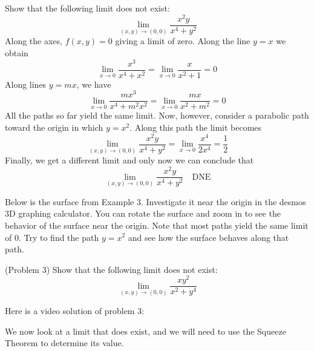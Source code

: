 \documentclass[handout]{ximera}
\begin{document}
\begin{example}[Example 3]
Show that the following limit does not exist:
\[
\lim_{(x,y) \to (0,0)} \frac{x^2y}{x^4 + y^2}
\]
Along the axes, $f(x,y) = 0$ giving a limit of zero. Along the line $y = x$ we obtain 
\[
\lim_{x\to 0} \frac{x^3}{x^4 + x^2} = \lim_{x\to 0} \frac{x}{x^2 + 1} = 0
\]
Along lines $ y = mx$, we have
\[
\lim_{x\to 0} \frac{mx^3}{x^4 + m^2x^2} = \lim_{x\to 0} \frac{mx}{x^2 + m^2} = 0
\]
All the paths so far yield the same limit.  Now, however, consider a parabolic path 
toward the origin in which $y = x^2$.
Along this path the limit becomes
\[
\lim_{(x,y) \to (0,0)} \frac{x^2y}{x^4 + y^2} =  \lim_{x \to 0} \frac{x^4}{2x^4} = \frac12
\]
Finally, we get a different limit and only now we can conclude that
\[
\lim_{(x,y) \to (0,0)} \frac{x^2y}{x^4 + y^2} \quad \text{DNE}
\]

\end{example}
Below is the surface from Example 3.  Investigate it near the origin in the 
desmos 3D graphing calculator.  
You can rotate the surface and zoom in to see the behavior of the surface near the origin.
Note that most paths yield the same limit of $0$.  
Try to find the path $y = x^2$ and see how the surface behaves along that path.  

\begin{center}
\end{center}


\begin{problem}(Problem 3)
Show that the following limit does not exist:
\[
\lim_{(x,y) \to (0,0)} \frac{xy^2}{x^2 + y^4}
\]
\end{problem}

Here is a video solution of problem 3:\\

\begin{foldable}
\end{foldable}



We now look at a limit that does exist, and we will need to use the Squeeze Theorem to 
determine its value.
\end{document}
